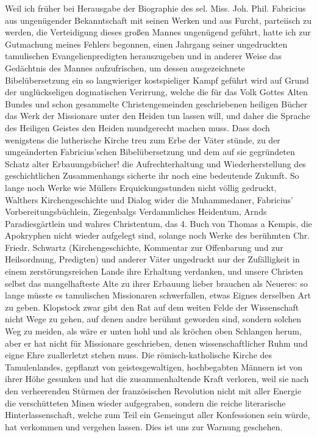 \documentclass{article}
\begin{document}
Weil ich früher bei Herausgabe der Biographie des sel. Miss. Joh. Phil. Fabricius aus ungenügender Bekanntschaft mit seinen Werken und aus Furcht, parteiisch zu werden, die Verteidigung dieses großen Mannes ungenügend geführt, hatte ich zur Gutmachung meines Fehlers begonnen, einen Jahrgang seiner ungedruckten tamulischen Evangelienpredigten herauszugeben und in anderer Weise das Gedächtnis des Mannes aufzufrischen, um dessen ausgezeichnete Bibelübersetzung ein so langwieriger kostspieliger Kampf geführt wird auf Grund der unglückseligen dogmatischen Verirrung, welche die für das Volk Gottes Alten Bundes und schon gesammelte Christengemeinden geschriebenen heiligen Bücher das Werk der Missionare unter den Heiden tun lassen will, und daher die Sprache des Heiligen Geistes den Heiden mundgerecht machen muss. Dass doch wenigstens die lutherische Kirche treu zum Erbe der Väter stünde, zu der umgeänderten Fabricius'schen Bibelübersetzung und dem auf sie gegründeten Schatz alter Erbauungsbücher! die Aufrechterhaltung und Wiederherstellung des geschichtlichen Zusammenhangs sicherte ihr noch eine bedeutende Zukunft. So lange noch Werke wie Müllers Erquickungsstunden nicht völlig gedruckt, Walthers Kirchengeschichte und Dialog wider die Muhammedaner, Fabricius' Vorbereitungsbüchlein, Ziegenbalgs Verdammliches Heidentum, Arnds Paradiesgärtlein und wahres Christentum, das 4. Buch von Thomas a Kempis, die Apokryphen nicht wieder aufgelegt sind, solange noch Werke des berühmten Chr. Friedr. Schwartz (Kirchengeschichte, Kommentar zur Offenbarung und zur Heilsordnung, Predigten) und anderer Väter ungedruckt nur der Zufälligkeit in einem zerstörungsreichen Lande ihre Erhaltung verdanken, und unsere Christen selbst das mangelhafteste Alte zu ihrer Erbauung lieber brauchen als Neueres: so lange müsste es tamulischen Missionaren schwerfallen, etwas Eignes derselben Art zu geben. Klopstock zwar gibt den Rat auf dem weiten Felde der Wissenschaft nicht Wege zu gehen, auf denen andre berühmt geworden sind, sondern solchen Weg zu meiden, als wäre er unten hohl und als kröchen oben Schlangen herum, aber er hat nicht für Missionare geschrieben, denen wissenschaftlicher Ruhm und eigne Ehre zuallerletzt stehen muss. Die römisch-katholische Kirche des Tamulenlandes, gepflanzt von geistesgewaltigen, hochbegabten Männern ist von ihrer Höhe gesunken und hat die zusammenhaltende Kraft verloren, weil sie nach den verheerenden Stürmen der französischen Revolution nicht mit aller Energie die verschütteten Minen wieder aufgegraben, sondern die reiche literarische Hinterlassenschaft, welche zum Teil ein Gemeingut aller Konfessionen sein würde, hat verkommen und vergehen lassen. Dies ist uns zur Warnung geschehen.
\end{document}
